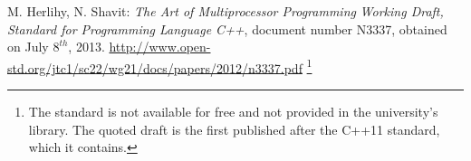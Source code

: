 \documentclass[a4paper,10pt]{article}
\begin{document}
\begin{thebibliography}{9}
    M. Herlihy, N. Shavit:
   \emph{The Art of Multiprocessor Programming}
	\emph{Working Draft, Standard for Programming Language C++},
	document number N3337, obtained on July $8^{th}$, 2013.	
    \url{http://www.open-std.org/jtc1/sc22/wg21/docs/papers/2012/n3337.pdf}
	\footnote{The standard is not available for free and not provided in the
    university's  library. The quoted draft is the first published after the
    C++11 standard, which it contains.}

\end{thebibliography}
\end{document}
